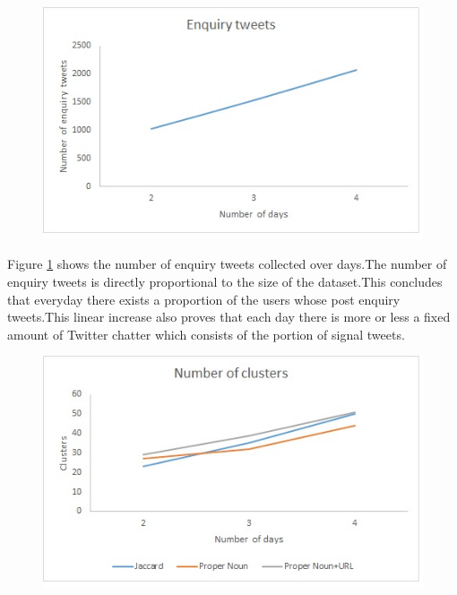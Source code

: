 		\begin{figure}[H]
			\centering
			\begin{minipage}{.7\linewidth}
				\includegraphics[width=\linewidth]{images/result1new.jpg}
				\label{img1}
				\end{minipage}
		\end{figure}
		
		Figure \ref{img1} shows the number of enquiry tweets collected over days.The number of enquiry tweets is directly proportional to the size of the dataset.This concludes that everyday there exists a proportion of the users whose post enquiry tweets.This linear increase also proves that each day  there is more or less a fixed amount of Twitter chatter which consists of the portion of signal tweets.
				
		\begin{figure}[H]
					\centering
					\begin{minipage}{.7\linewidth}
						\includegraphics[width=\linewidth]{images/result2new.jpg}
						\label{img2}
						\end{minipage}
		\end{figure}
		
